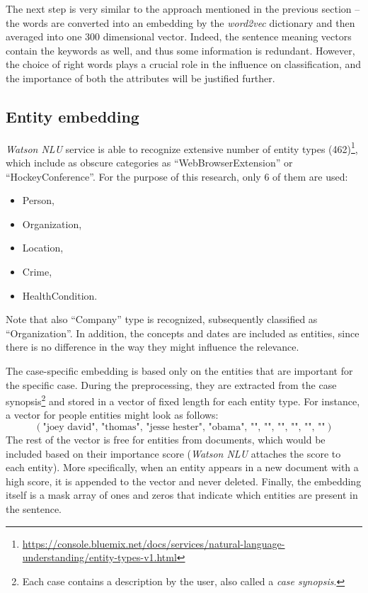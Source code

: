 \documentclass[
  digital, %
  notable,   %
  nolof,     %
  nolot,     %
]{fithesis3}
\begin{document}
The next step is very similar to the approach mentioned in the previous section -- the words are converted into an embedding by the \textit{word2vec} dictionary and then averaged into one 300 dimensional vector.
Indeed, the sentence meaning vectors contain the keywords as well, and thus some information is redundant.
However, the choice of right words plays a crucial role in the influence on classification, and the importance of both the attributes will be justified further.

\subsection{Entity embedding}
\label{sec:entity_embedding}
\textit{Watson NLU} service is able to recognize extensive number of entity types (462)\footnote{\url{https://console.bluemix.net/docs/services/natural-language-understanding/entity-types-v1.html}}, 
which include as obscure categories as ``WebBrowserExtension'' or ``HockeyConference''.
For the purpose of this research, only 6 of them are used:
\begin{itemize}
\item Person,
\item Organization,
\item Location,
\item Crime,
\item HealthCondition.
\end{itemize}
Note that also ``Company'' type is recognized, subsequently classified as ``Organization''.
In addition, the concepts and dates are included as entities, since there is no difference in the way they might influence the relevance.

The case-specific embedding is based only on the entities that are important for the specific case.
During the preprocessing, they are extracted from the case synopsis\footnote{Each case contains a description by the user, also called a \textit{case synopsis}.} and stored in a vector of fixed length for each entity type. For instance, a vector for people entities might look as follows:
$$
(\text{"joey david", "thomas", "jesse hester", "obama", "", "", "", "", "", ""})
$$
The rest of the vector is free for entities from documents, which would be included based on their importance score (\textit{Watson NLU} attaches the score to each entity).
More specifically, when an entity appears in a new document with a high score, it is appended to the vector and never deleted.
Finally, the embedding itself is a mask array of ones and zeros that indicate which entities are present in the sentence.
\end{document}
